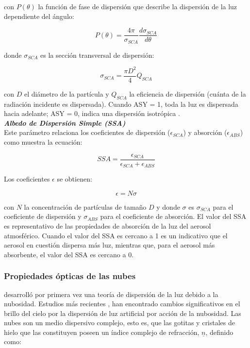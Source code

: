con $P(\theta)$ la función de fase de dispersión que describe la dispersión de la luz dependiente del ángulo:

\begin{equation}
P(\theta) = \frac{4\pi}{\sigma_{SCA}} \frac{d\sigma_{SCA}}{d\theta}
\end{equation}

donde $\sigma_{SCA}$ es la sección transversal de dispersión:

\begin{equation}
\sigma_{SCA} = \frac{\pi D^{2}}{4} Q_{SCA}
\end{equation}

con $D$ el diámetro de la partícula y $Q_{SCA}$ la eficiencia de dispersión (cuánta de la radiación incidente es dispersada). Cuando ASY = 1, toda la luz es dispersada hacia adelante; ASY = 0, indica una dispersión isotrópica \citep{Solano2015}.
\\

\textit{\textbf{Albedo de Dispersión Simple (SSA)}}\\

Este parámetro relaciona los coeficientes de dispersión ($\epsilon_{SCA}$) y absorción ($\epsilon_{ABS}$) \citep{Foot1987} como muestra la ecuación:

\begin{equation}
SSA = \frac{\epsilon_{SCA}}{\epsilon_{SCA} + \epsilon_{ABS}}
\end{equation}


Los coeficientes $\epsilon$ se obtienen:

\begin{equation}
\epsilon = N \sigma
\end{equation}

con $N$ la concentración de partículas de tamaño $D$ y donde $\sigma$ es $\sigma_{SCA}$ para el coeficiente de dispersión y $\sigma_{ABS}$ para el coeficiente de absorción. El valor del SSA es representativo de las propiedades de absorción de la luz del aerosol atmosférico. Cuando el valor del SSA es cercano a 1 es un indicativo que el aerosol en cuestión dispersa más luz, mientras que, para el aerosol más absorbente, el valor del SSA es cercano a 0.\\

\subsubsection{Propiedades ópticas de las nubes}

\cite{Twomey1967} desarrolló por primera vez una teoría de dispersión de la luz debido a la nubosidad. Estudios más recientes \citep{Kocifaj2007,Solano2014,Solano2015}, han encontrado cambios significativos en el brillo del cielo por la dispersión de luz artificial por acción de la nubosidad. Las nubes son un medio dispersivo complejo, esto es, que las gotitas y cristales de hielo que las constituyen poseen un índice complejo de refracción, $\underline{n}$, definido como:

